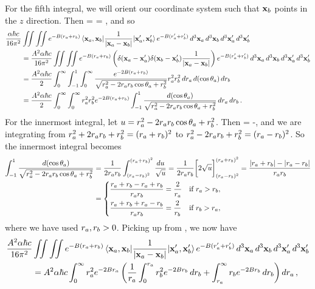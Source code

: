 \begin{solution}
	For the fifth integral, we will orient our coordinate system such that $\vb{x}_b$ points in the $z$ direction.  Then
	\beq
		 = 
		= ,
	\eeq
	and so
	\begin{align}
		\frac{\alpha \hbar c}{16\pi^2} &\iint \iint e^{-B(r_a + r_b)} \mel{\vb{x}_a, \vb{x}_b}{\frac{1}{\abs{\vb{x}_a- \vb{x}_b}}}{\vb{x}_a', \vb{x}_b'} e^{-B(r_a' + r_b')} \dd[3]{\vb{x}_a} \dd[3]{\vb{x}_b} \dd[3]{\vb{x}_a'} \dd[3]{\vb{x}_b'} \notag \\
		&= \frac{A^2 \alpha \hbar c}{16\pi^2} \iint \iint e^{-B(r_a + r_b)}  \left( \delta(\vb{x}_a - \vb{x}_a') \delta(\vb{x}_b - \vb{x}_b') \frac{1}{\abs{\vb{x}_a - \vb{x}_b}} \right) e^{-B(r_a' + r_b')} \dd[3]{\vb{x}_a} \dd[3]{\vb{x}_b} \dd[3]{\vb{x}_a'} \dd[3]{\vb{x}_b'} \notag \\
		&= \frac{A^2 \alpha \hbar c}{2} \int_0^\infty \int_{-1}^1 \int_0^\infty \frac{e^{-2B(r_a + r_b)}}{\sqrt{r_a^2 - 2 r_a r_b \cos\theta_a + r_b^2}} r_a^2 r_b^2 \dd{r_a} \dd{(\cos\theta_a)} \dd{r_b} \notag \\
		&= \frac{A^2 \alpha \hbar c}{2} \int_0^\infty \int_0^\infty r_a^2 r_b^2 e^{-2B(r_a + r_b)} \int_{-1}^1 \frac{\dd{(\cos\theta_a)}}{\sqrt{r_a^2 - 2 r_a r_b \cos\theta_a + r_b^2}} \dd{r_a} \dd{r_b}. \label{leftoff}
	\end{align}
	For the innermost integral, let $u = r_a^2 - 2 r_a r_b \cos\theta_a + r_b^2$.  Then
	\beq
		\dcta = -\frac{\du}{2 \ra \rb},
	\eeq
	and we are integrating from $r_a^2 + 2 r_a r_b + r_b^2 = (r_a + r_b)^2$ to $r_a^2 - 2 r_a r_b + r_b^2 = (r_a - r_b)^2$.  So the innermost integral becomes
	\begin{align*}
		\int_{-1}^1 \frac{\dd{(\cos\theta_a)}}{\sqrt{r_a^2 - 2 r_a r_b \cos\theta_a + r_b^2}} &= \frac{1}{2 r_a r_b} \int_{(r_a - r_b)^2}^{(r_a + r_b)^2} \frac{\dd{u}}{\sqrt{u}}
		= \frac{1}{2 r_a r_b} \bigg[ 2 \sqrt{u} \bigg]_{(r_a - r_b)^2}^{(r_a + r_b)^2}
		= \frac{\abs{r_a + r_b} - \abs{r_a - r_b}}{r_a r_b} \\
		&= \begin{cases}
			\dfrac{r_a + r_b - r_a + r_b}{r_a r_b} = \dfrac{2}{r_a} & \text{if } r_a > r_b, \\[2ex]
			\dfrac{r_a + r_b + r_a - r_b}{r_a r_b} = \dfrac{2}{r_b} & \text{if } r_b > r_a,
		\end{cases}
	\end{align*}
	where we have used $r_a, r_b > 0$.  Picking up from , we now have
	\begin{align}
		\frac{A^2 \alp \hbar c}{16\pi^2} &\iint \iint e^{-B(\ra + \rb)} \mel{\vxa, \vxb}{\frac{1}{\abs{\vxa - \vxb}}}{\vxa', \vxb'} e^{-B(\ra' + \rb')} \dcxa \dcxb \dcxap \dcxbp \notag \\
		&= A^2 \alp \hbar c \intoi \ra^2 e^{-2B \ra} \left( \frac{1}{\ra} \int_0^{\ra} \rb^2 e^{-2B \rb} \drb + \int_{\ra}^\infty \rb e^{-2B \rb} \drb \right) \dra, \label{leftoff2}

\end{align}
\end{solution}
